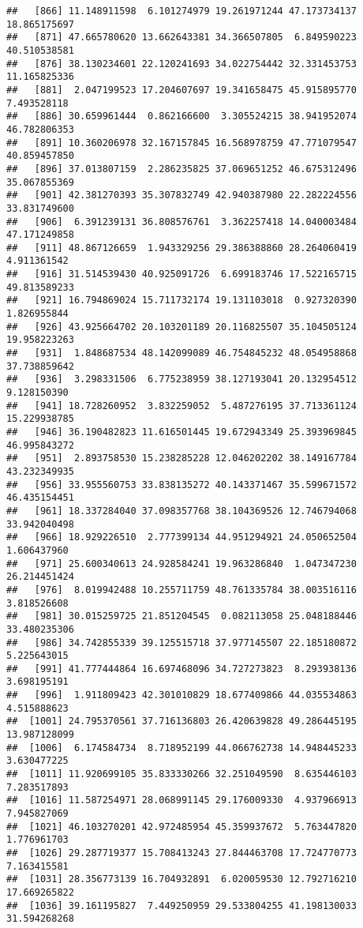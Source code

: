 \documentclass[
]{article}
\begin{document}
\begin{verbatim}
##   [866] 11.148911598  6.101274979 19.261971244 47.173734137 18.865175697
##   [871] 47.665780620 13.662643381 34.366507805  6.849590223 40.510538581
##   [876] 38.130234601 22.120241693 34.022754442 32.331453753 11.165825336
##   [881]  2.047199523 17.204607697 19.341658475 45.915895770  7.493528118
##   [886] 30.659961444  0.862166600  3.305524215 38.941952074 46.782806353
##   [891] 10.360206978 32.167157845 16.568978759 47.771079547 40.859457850
##   [896] 37.013807159  2.286235825 37.069651252 46.675312496 35.067855369
##   [901] 42.381270393 35.307832749 42.940387980 22.282224556 33.831749600
##   [906]  6.391239131 36.808576761  3.362257418 14.040003484 47.171249858
##   [911] 48.867126659  1.943329256 29.386388860 28.264060419  4.911361542
##   [916] 31.514539430 40.925091726  6.699183746 17.522165715 49.813589233
##   [921] 16.794869024 15.711732174 19.131103018  0.927320390  1.826955844
##   [926] 43.925664702 20.103201189 20.116825507 35.104505124 19.958223263
##   [931]  1.848687534 48.142099089 46.754845232 48.054958868 37.738859642
##   [936]  3.298331506  6.775238959 38.127193041 20.132954512  9.128150390
##   [941] 18.728260952  3.832259052  5.487276195 37.713361124 15.229938785
##   [946] 36.190482823 11.616501445 19.672943349 25.393969845 46.995843272
##   [951]  2.893758530 15.238285228 12.046202202 38.149167784 43.232349935
##   [956] 33.955560753 33.838135272 40.143371467 35.599671572 46.435154451
##   [961] 18.337284040 37.098357768 38.104369526 12.746794068 33.942040498
##   [966] 18.929226510  2.777399134 44.951294921 24.050652504  1.606437960
##   [971] 25.600340613 24.928584241 19.963286840  1.047347230 26.214451424
##   [976]  8.019942488 10.255711759 48.761335784 38.003516116  3.818526608
##   [981] 30.015259725 21.851204545  0.082113058 25.048188446 33.480235306
##   [986] 34.742855339 39.125515718 37.977145507 22.185180872  5.225643015
##   [991] 41.777444864 16.697468096 34.727273823  8.293938136  3.698195191
##   [996]  1.911809423 42.301010829 18.677409866 44.035534863  4.515888623
##  [1001] 24.795370561 37.716136803 26.420639828 49.286445195 13.987128099
##  [1006]  6.174584734  8.718952199 44.066762738 14.948445233  3.630477225
##  [1011] 11.920699105 35.833330266 32.251049590  8.635446103  7.283517893
##  [1016] 11.587254971 28.068991145 29.176009330  4.937966913  7.945827069
##  [1021] 46.103270201 42.972485954 45.359937672  5.763447820  1.776961703
##  [1026] 29.287719377 15.708413243 27.844463708 17.724770773  7.163415581
##  [1031] 28.356773139 16.704932891  6.020059530 12.792716210 17.669265822
##  [1036] 39.161195827  7.449250959 29.533804255 41.198130033 31.594268268

\end{verbatim}
\end{document}

